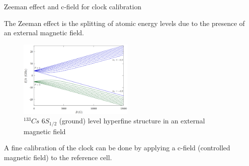\begin{frame}{Zeeman effect and c-field for clock calibration}

    The Zeeman effect is the splitting of atomic energy levels due to the presence of an external magnetic field.

    \begin{figure}
        \centering
        \includegraphics[width=0.5\textwidth]{img/extra-zeeman-splitting.png}
        \caption{$^{133}Cs$ $6S_{1/2}$ (ground) level hyperfine structure in an external magnetic field}
    \end{figure}

    A fine calibration of the clock can be done by applying a c-field (controlled magnetic field) to the reference cell.

\end{frame}
